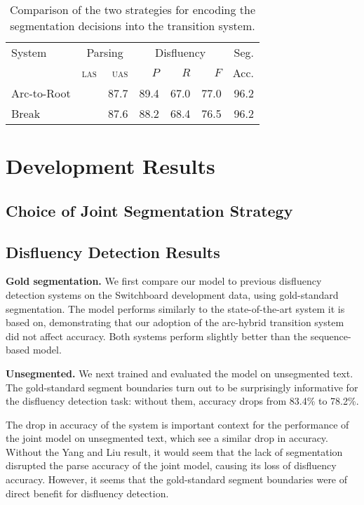 \documentclass[11pt,letterpaper]{article}
\begin{document}
\begin{table}
    \centering
    \small
    \begin{tabular}{l|rr | rrr | r}
        System & \multicolumn{2}{c|}{Parsing} & \multicolumn{3}{c|}{Disfluency} & Seg. \\
               & \textsc{las} & \textsc{uas}  & $P$ & $R$ & $F$                 & Acc. \\
        \hline \hline

        Arc-to-Root &      & 87.7 & 89.4 & 67.0 & 77.0 & 96.2 \\
        Break       &      & 87.6 & 88.2 & 68.4 & 76.5 & 96.2 \\
        \hline
    \end{tabular}
    \caption{\small Comparison of the two strategies for encoding the
    segmentation decisions into the transition system.}
\end{table}

\section{Development Results}

\subsection{Choice of Joint Segmentation Strategy}

\subsection{Disfluency Detection Results}
\label{sec:results}

\textbf{Gold segmentation.}
We first compare our model to previous disfluency detection systems on the
Switchboard development data, using gold-standard segmentation.  The model
performs similarly to the state-of-the-art \citet{honnibal:14} system it is based
on, demonstrating that our adoption of the arc-hybrid transition system did not
affect accuracy. Both systems perform slightly better than the \citet{qian:13}
sequence-based model.

\textbf{Unsegmented.}
We next trained and evaluated the \citet{qian:13} model on unsegmented text.
The gold-standard segment boundaries turn out to be surprisingly informative
for the disfluency detection task: without them, accuracy drops from 83.4\% to
78.2\%.

The drop in accuracy of the \citet{qian:13} system is important context
for the performance of the joint model on unsegmented text, which see
a similar drop in accuracy.  Without the Yang and Liu result, it would seem
that the lack of segmentation disrupted the parse accuracy of the joint model,
causing its loss of disfluency accuracy.  However, it seems that the gold-standard
segment boundaries were of direct benefit for disfluency detection.
\end{document}
